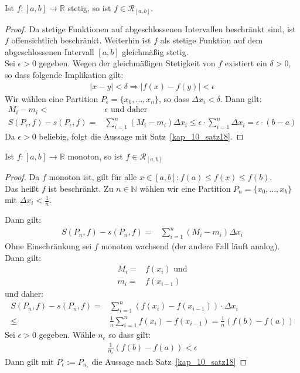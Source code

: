 \begin{Satz}{\label{kap10_satz20}
	Ist $f: [a,b] \rightarrow \mathbb{R}$ stetig, so ist 
	$ f \in \mathcal{R}_{[a,b]}$.
}\end{Satz}

\begin{proof}
	Da stetige Funktionen auf abgeschlossenen Intervallen 
	beschränkt sind, ist $f$ offensichtlich beschränkt. Weiterhin ist $f$ als stetige 
	Funktion auf dem abgeschlossenen Intervall $[a,b]$ gleichmäßig stetig. \\
	Sei $\epsilon > 0 $ gegeben. Wegen der gleichmäßigen Stetigkeit von $f$ 
	existiert ein $\delta > 0$, so dass folgende Implikation gilt:
	\begin{align*}
		\vert x - y \vert < \delta \Rightarrow \vert f(x) -f(y) \vert < \epsilon
	\end{align*}
	Wir wählen eine Partition $P_{\epsilon} = \{ x_0, \hdots, x_n \}$, so dass 
	$\Delta x_i < \delta$. Dann gilt:
	\begin{align*}
		M_i - m_i < & \epsilon \text{ und daher} \\
		S(P_{\epsilon},f) - s(P_{\epsilon},f) = & \sum_{i = 1}^n (M_i -m_i)\Delta x_i 
		\leq \epsilon \cdot \sum_{i = 1}^n \Delta x_i = \epsilon \cdot (b-a)
	\end{align*}
	Da $\epsilon > 0$ beliebig, folgt die Aussage mit Satz~\ref{kap_10_satz18}.
\end{proof}

\begin{Satz}{
		Ist $f: [a,b] \rightarrow \mathbb{R}$ monoton, so ist 
		$f \in \mathcal{R}_{[a,b]}$ 
}\end{Satz}

\begin{proof}
	 Da $f$ monoton ist, gilt für alle $x \in [a,b]: f(a) \leq f(x) 
	\leq f(b)$. \\
	Das heißt $f$ ist beschränkt. Zu $n \in \mathbb{N}$ wählen wir eine 
	Partition \linebreak $P_n = \{x_0, \hdots, x_k\}$ mit $\Delta x_i < \frac{1}{n}$.
	
	Dann gilt:
	\begin{align*}
		S(P_n, f) - s(P_n,f) = & \sum_{i=1}^n (M_i - m_i)\Delta x_i
	\end{align*}
	Ohne Einschränkung sei $f$ monoton wachsend (der andere Fall läuft analog).
	Dann gilt:
	\begin{align*}
		M_i = & f(x_i) \text{ und} \\
		m_i = & f(x_{i-1})
	\end{align*} und daher:
	\begin{align*}
		S(P_n, f) - s(P_n,f) = & \sum_{i=1}^n (f(x_i) -f(x_{i-1}))\cdot \Delta x_i 
		\\ \leq & \frac{1}{	n}\sum_{i=1}^n f(x_i) -f(x_{i-1}) = 
		\frac{1}{n} (f(b) -f(a)) 
	\end{align*}
	Sei $\epsilon > 0$ gegeben. Wähle $n_{\epsilon}$ so dass gilt:
	\begin{align*}
		\frac{1}{n_{\epsilon}}(f(b) -f(a)) < \epsilon
	\end{align*}
	Dann gilt mit $P_{\epsilon} := P_{n_{\epsilon}}$ die Aussage nach Satz~\ref{kap_10_satz18}
\end{proof}

